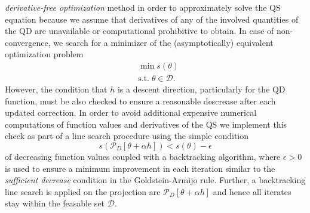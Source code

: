 \documentclass[article, nojss]{jss}
\numberwithin{equation}{section}			%
\newcommand{\D}{\mathcal{D}}
\begin{document}
\emph{derivative-free optimization} method \citep[see, e.\,g.][]{ref:Conn2009} in order to approximately
solve the QS equation because we assume that derivatives of any of the involved
quantities of the QD are unavailable or computational prohibitive to obtain. In case of non-convergence,
we search for a minimizer of the (asymptotically) equivalent optimization
problem
\begin{align}\label{eOP}
   &\min s(\theta) \\
   &\text{s.t.}\; \theta\in\D.
\end{align}
However, the condition that $h$ is a descent direction, particularly for the QD
function, must be also checked to ensure a reasonable descrease after each updated
correction. In order to avoid additional expensive numerical computations of
function values and derivatives of the QS we implement this check as part of a line search
procedure using the simple condition
\begin{equation}\label{simple}
  s(\mathcal{P}_D[\theta+\alpha h]) < s(\theta) - \epsilon 
\end{equation}
of decreasing function values coupled with a backtracking algorithm, where
$\epsilon>0$ is used to ensure a minimum improvement in each iteration
similar to the \emph{sufficient decrease} condition in the Goldstein-Armijo
rule. Further, a backtracking line search is applied on the projection arc
$\mathcal{P}_D[\theta+\alpha h]$ and hence all iterates stay within the feasable
set $\D$.\par
%
\end{document}
